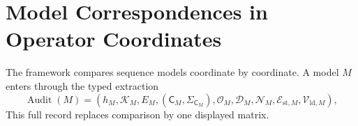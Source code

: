 \documentclass[10pt]{article}
\theoremstyle{definition}
\theoremstyle{remark}
\newcommand{\BookPart}[1]{}
\newcommand{\BookChapter}[1]{\section{#1}}
\newcommand{\BookInsert}[1]{}
\newcommand{\BookChapterLabel}[1]{}
\begin{document}
\BookInsert{chapters/06_pair_law_compatibility_example}

\BookInsert{chapters/06_mezard_cavity_tree}

\BookInsert{chapters/06_coda}
\BookPart{Models, Estimation, and Spectra}
\BookChapter{Model Correspondences in Operator Coordinates}
\BookChapterLabel{chap:book-models}
\BookInsert{chapters/07_opening}

The framework compares sequence models coordinate by coordinate.  A model $M$ enters through the
typed extraction
\begin{equation}
\operatorname{Audit}(M)
=\left(h_M,\mathcal K_M,E_M,(\mathsf C_M,\Sigma_{\mathsf C_M}),\mathcal O_M,
\mathcal D_M,\mathcal N_M,\mathcal E_{\mathrm{st},M},\mathcal V_{\!\mathrm{ld},M}\right),
\label{eq:model-audit-map}
\end{equation}
This full record replaces comparison by one displayed matrix.
\end{document}
